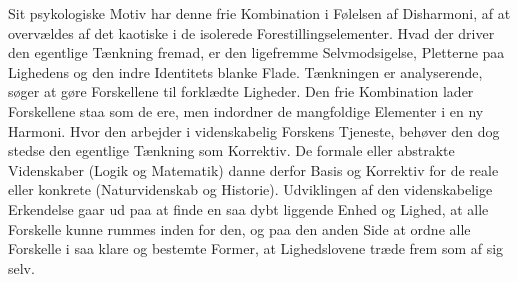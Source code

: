 \documentclass[12pt,a4paper,openany]{book}
\newcommand{\opage}[1]{\marginnote{\footnotesize\textit{[#1]}}}
\begin{document}
Sit psykologiske Motiv har denne frie Kombination i Følelsen af
Disharmoni, af at overvældes af det kaotiske i de isolerede
Forestillingselementer. Hvad der driver den egentlige Tænkning fremad,
er den ligefremme Selvmodsigelse, Pletterne paa Lighedens og den indre
Identitets blanke Flade. Tænkningen er analyserende, søger at gøre
Forskellene til forklædte Ligheder. Den frie Kombination lader
Forskellene staa som de ere, men indordner de mangfoldige Elementer i en
ny
\opage{223}Harmoni. Hvor den arbejder i videnskabelig Forskens Tjeneste,
behøver den dog stedse den egentlige Tænkning som Korrektiv. De formale
eller abstrakte Videnskaber (Logik og Matematik) danne derfor Basis og
Korrektiv for de reale eller konkrete (Naturvidenskab og Historie).
Udviklingen af den videnskabelige Erkendelse gaar ud paa at finde en saa
dybt liggende Enhed og Lighed, at alle Forskelle kunne rummes inden for
den, og paa den anden Side at ordne alle Forskelle i saa klare og
bestemte Former, at Lighedslovene træde frem som af sig selv.
\end{document}
